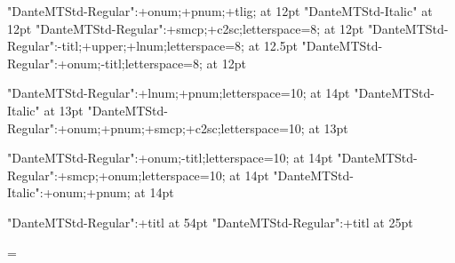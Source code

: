 






\font\twelverm 	"DanteMTStd-Regular":+onum;+pnum;+tlig; at 12pt
\font\twelveit 	"DanteMTStd-Italic" at 12pt
\font\twelvesc 	"DanteMTStd-Regular":+smcp;+c2sc;letterspace=8; at 12pt
\font\twelvetit "DanteMTStd-Regular":-titl;+upper;+lnum;letterspace=8; at 12.5pt
\font\twelvetitb "DanteMTStd-Regular":+onum;-titl;letterspace=8; at 12pt


\font\thirteenrm "DanteMTStd-Regular":+lnum;+pnum;letterspace=10; at 14pt
\font\thirteenit "DanteMTStd-Italic" at 13pt
\font\thirteensc "DanteMTStd-Regular":+onum;+pnum;+smcp;+c2sc;letterspace=10; at 13pt

\font\fourteentit "DanteMTStd-Regular":+onum;-titl;letterspace=10; at 14pt
\font\fourteensc "DanteMTStd-Regular":+smcp;+onum;letterspace=10; at 14pt
\font\fourteenit "DanteMTStd-Italic":+onum;+pnum; at 14pt

\font\fiftyfourtit "DanteMTStd-Regular":+titl at 54pt
\font\dcquotefont "DanteMTStd-Regular":+titl at 25pt

\def\dccapfont{\fiftyfourtit\red}

\def\secIfontA{\thirteenrm}
\def\secIfontB{\eighteenrm}

\def\secIIfont{\twelvetit}


\def\normalsize{%
	\gdef\rm{\twelverm}%
	\gdef\it{\twelveit}%
	\gdef\sc{\twelvesc}%
	\gdef\tit{\twelvetit}%
}

\def\emph{\it}

\normalsize\rm



\baselineskip=14.06pt

\topskip=\baselineskip

\frenchspacing

\parskip=0pt

